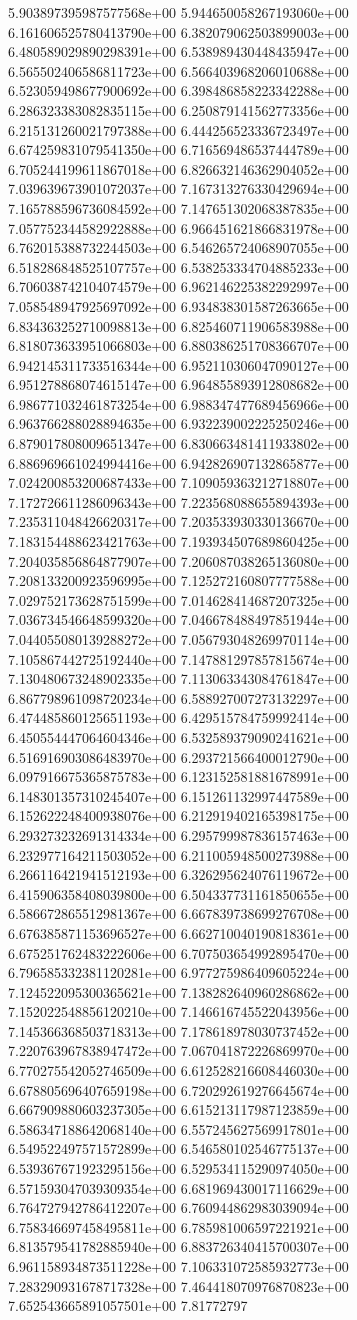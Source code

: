 	5.903897395987577568e+00	5.944650058267193060e+00	6.161606525780413790e+00	6.382079062503899003e+00	6.480589029890298391e+00	6.538989430448435947e+00	6.565502406586811723e+00	6.566403968206010688e+00	6.523059498677900692e+00	6.398486858223342288e+00	6.286323383082835115e+00	6.250879141562773356e+00	6.215131260021797388e+00	6.444256523336723497e+00	6.674259831079541350e+00	6.716569486537444789e+00	6.705244199611867018e+00	6.826632146362904052e+00	7.039639673901072037e+00	7.167313276330429694e+00	7.165788596736084592e+00	7.147651302068387835e+00	7.057752344582922888e+00	6.966451621866831978e+00	6.762015388732244503e+00	6.546265724068907055e+00	6.518286848525107757e+00	6.538253334704885233e+00	6.706038742104074579e+00	6.962146225382292997e+00	7.058548947925697092e+00	6.934838301587263665e+00	6.834363252710098813e+00	6.825460711906583988e+00	6.818073633951066803e+00	6.880386251708366707e+00	6.942145311733516344e+00	6.952110306047090127e+00	6.951278868074615147e+00	6.964855893912808682e+00	6.986771032461873254e+00	6.988347477689456966e+00	6.963766288028894635e+00	6.932239002225250246e+00	6.879017808009651347e+00	6.830663481411933802e+00	6.886969661024994416e+00	6.942826907132865877e+00	7.024200853200687433e+00	7.109059363212718807e+00	7.172726611286096343e+00	7.223568088655894393e+00	7.235311048426620317e+00	7.203533930330136670e+00	7.183154488623421763e+00	7.193934507689860425e+00	7.204035856864877907e+00	7.206087038265136080e+00	7.208133200923596995e+00	7.125272160807777588e+00	7.029752173628751599e+00	7.014628414687207325e+00	7.036734546648599320e+00	7.046678488497851944e+00	7.044055080139288272e+00	7.056793048269970114e+00	7.105867442725192440e+00	7.147881297857815674e+00	7.130480673248902335e+00	7.113063343084761847e+00	6.867798961098720234e+00	6.588927007273132297e+00	6.474485860125651193e+00	6.429515784759992414e+00	6.450554447064604346e+00	6.532589379090241621e+00	6.516916903086483970e+00	6.293721566400012790e+00	6.097916675365875783e+00	6.123152581881678991e+00	6.148301357310245407e+00	6.151261132997447589e+00	6.152622248400938076e+00	6.212919402165398175e+00	6.293273232691314334e+00	6.295799987836157463e+00	6.232977164211503052e+00	6.211005948500273988e+00	6.266116421941512193e+00	6.326295624076119672e+00	6.415906358408039800e+00	6.504337731161850655e+00	6.586672865512981367e+00	6.667839738699276708e+00	6.676385871153696527e+00	6.662710040190818361e+00	6.675251762483222606e+00	6.707503654992895470e+00	6.796585332381120281e+00	6.977275986409605224e+00	7.124522095300365621e+00	7.138282640960286862e+00	7.152022548856120210e+00	7.146616745522043956e+00	7.145366368503718313e+00	7.178618978030737452e+00	7.220763967838947472e+00	7.067041872226869970e+00	6.770275542052746509e+00	6.612528216608446030e+00	6.678805696407659198e+00	6.720292619276645674e+00	6.667909880603237305e+00	6.615213117987123859e+00	6.586347188642068140e+00	6.557245627569917801e+00	6.549522497571572899e+00	6.546580102546775137e+00	6.539367671923295156e+00	6.529534115290974050e+00	6.571593047039309354e+00	6.681969430017116629e+00	6.764727942786412207e+00	6.760944862983039094e+00	6.758346697458495811e+00	6.785981006597221921e+00	6.813579541782885940e+00	6.883726340415700307e+00	6.961158934873511228e+00	7.106331072585932773e+00	7.283290931678717328e+00	7.464418070976870823e+00	7.652543665891057501e+00	7.81772797